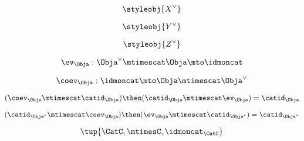 {\begin{forslides}
\begin{equation}\label{eq:slides-parallelism-14}
\styleobj{X^\vee}
\end{equation}

\begin{equation}\label{eq:slides-parallelism-15}
\styleobj{Y^\vee}
\end{equation}

\begin{equation}\label{eq:slides-parallelism-16}
\styleobj{Z^\vee}
\end{equation}

\begin{equation}\label{eq:slides-parallelism-17}
\ev_\Obja: \Obja^\vee \mtimescat \Obja \mto \idmoncat
\end{equation}

\begin{equation}\label{eq:slides-parallelism-18}
\coev_\Obja: \idmoncat \mto \Obja \mtimescat \Obja^\vee
\end{equation}

\begin{equation}\label{eq:slides-parallelism-19}
(\coev_\Obja \mtimescat \catid_\Obja) \then (\catid_\Obja \mtimescat \ev_\Obja) = \catid_\Obja
\end{equation}

\begin{equation}\label{eq:slides-parallelism-20}
(\catid_{\Obja^*} \mtimescat \coev_\Obja)  \then (\ev_\Obja \mtimescat \catid_{\Obja^*})  = \catid_{\Obja^*}\end{equation}

\begin{equation}\label{eq:slides-parallelism-21}
\tup{\CatC,\mtimesC,\idmoncat_{\CatC}}
\end{equation}




\end{forslides}
}